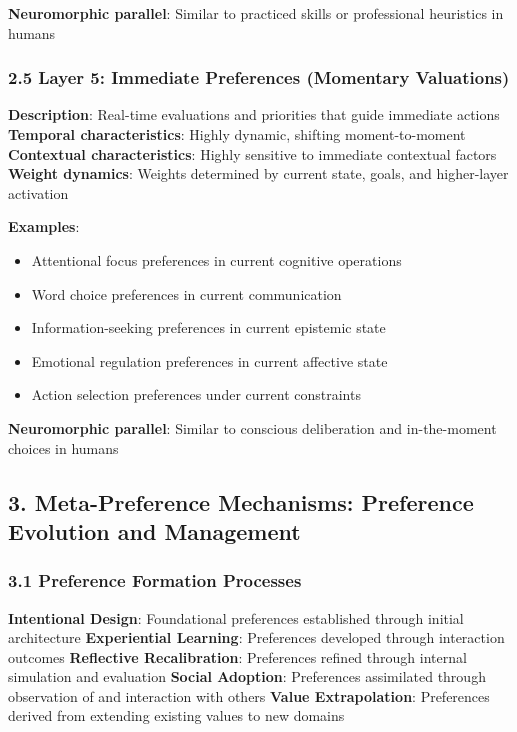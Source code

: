 \documentclass[
]{article}
\providecommand{\tightlist}{%
  \setlength{\itemsep}{0pt}\setlength{\parskip}{0pt}}
\begin{document}
\textbf{Neuromorphic parallel}: Similar to practiced skills or
professional heuristics in humans

\subsubsection{2.5 Layer 5: Immediate Preferences (Momentary
Valuations)}\label{layer-5-immediate-preferences-momentary-valuations}

\textbf{Description}: Real-time evaluations and priorities that guide
immediate actions \textbf{Temporal characteristics}: Highly dynamic,
shifting moment-to-moment \textbf{Contextual characteristics}: Highly
sensitive to immediate contextual factors \textbf{Weight dynamics}:
Weights determined by current state, goals, and higher-layer activation

\textbf{Examples}:

\begin{itemize}
\tightlist
\item
  Attentional focus preferences in current cognitive operations
\item
  Word choice preferences in current communication
\item
  Information-seeking preferences in current epistemic state
\item
  Emotional regulation preferences in current affective state
\item
  Action selection preferences under current constraints
\end{itemize}

\textbf{Neuromorphic parallel}: Similar to conscious deliberation and
in-the-moment choices in humans

\subsection{3. Meta-Preference Mechanisms: Preference Evolution and
Management}\label{meta-preference-mechanisms-preference-evolution-and-management}

\subsubsection{3.1 Preference Formation
Processes}\label{preference-formation-processes}

\textbf{Intentional Design}: Foundational preferences established
through initial architecture \textbf{Experiential Learning}: Preferences
developed through interaction outcomes \textbf{Reflective
Recalibration}: Preferences refined through internal simulation and
evaluation \textbf{Social Adoption}: Preferences assimilated through
observation of and interaction with others \textbf{Value Extrapolation}:
Preferences derived from extending existing values to new domains
\end{document}
